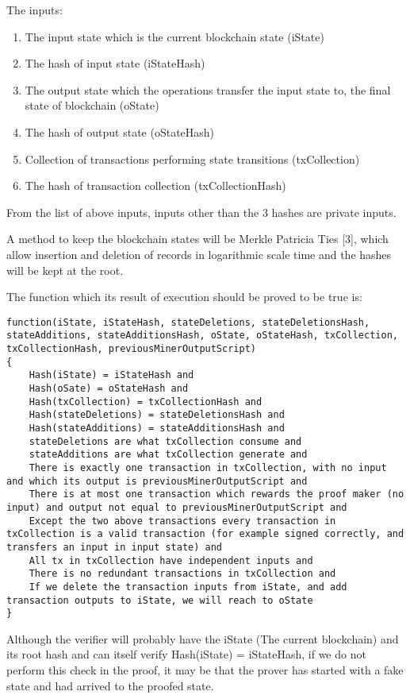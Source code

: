 \documentclass{article}
\begin{document}
The inputs:
\begin{enumerate}
\item The input state which is the current blockchain state (iState)
\item The hash of input state (iStateHash)
\item The output state which the operations transfer the input state to, the final state of blockchain (oState)
\item The hash of output state (oStateHash)
\item Collection of transactions performing state transitions (txCollection)
\item The hash of transaction collection (txCollectionHash)
\end{enumerate}
	
From the list of above inputs, inputs other than the 3 hashes are private inputs.

A method to keep the blockchain states will be Merkle Patricia Ties [3], which allow insertion and deletion of records in logarithmic scale time and the hashes will be kept at the root.

The function which its result of execution should be proved to be true is:

\begin{lstlisting}
function(iState, iStateHash, stateDeletions, stateDeletionsHash, stateAdditions, stateAdditionsHash, oState, oStateHash, txCollection, txCollectionHash, previousMinerOutputScript)
{
	Hash(iState) = iStateHash and
	Hash(oSate) = oStateHash and
	Hash(txCollection) = txCollectionHash and
	Hash(stateDeletions) = stateDeletionsHash and
	Hash(stateAdditions) = stateAdditionsHash and 
	stateDeletions are what txCollection consume and
	stateAdditions are what txCollection generate and
	There is exactly one transaction in txCollection, with no input and which its output is previousMinerOutputScript and 
	There is at most one transaction which rewards the proof maker (no input) and output not equal to previousMinerOutputScript and
	Except the two above transactions every transaction in txCollection is a valid transaction (for example signed correctly, and transfers an input in input state) and
	All tx in txCollection have independent inputs and
	There is no redundant transactions in txCollection and
	If we delete the transaction inputs from iState, and add transaction outputs to iState, we will reach to oState
}
\end{lstlisting}

Although the verifier will probably have the iState (The current blockchain) and its root hash and can itself verify Hash(iState) = iStateHash, if we do not perform this check in the proof, it may be that the prover has started with a fake state and had arrived to the proofed state.
\end{document}
